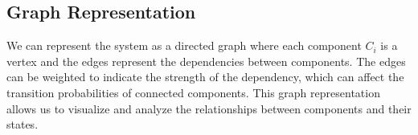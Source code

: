 \documentclass[answers,12pt,addpoints]{exam}
\begin{document}
\subsection{Graph Representation}
We can represent the system as a directed graph where each component $C_i$ is a vertex and the edges represent the dependencies between components. The edges can be weighted to indicate the strength of the dependency, which can affect the transition probabilities of connected components. This graph representation allows us to visualize and analyze the relationships between components and their states.


\end{document}
